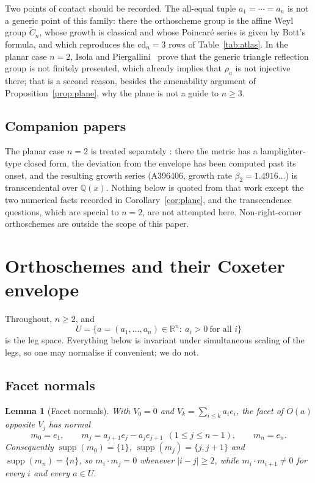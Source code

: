 \documentclass[11pt,a4paper]{article}
\newcommand{\R}{\mathbb{R}}
\newcommand{\Q}{\mathbb{Q}}
\newcommand{\cd}{\mathrm{cd}}
\newtheorem{lemma}[theorem]{Lemma}
\theoremstyle{definition}
\theoremstyle{remark}
\theoremstyle{plain}
\begin{document}
Two points of contact should be recorded. The all-equal tuple $a_1=\cdots=a_n$ is not a generic
point of this family: there the orthoscheme group is the affine Weyl group $\widetilde C_n$,
whose growth is classical and whose Poincar\'e series is given by Bott's formula, and which
reproduces the $\cd_n=3$ rows of Table~\ref{tab:atlas}. In the planar case $n=2$, Isola and
Piergallini~\cite{isola-piergallini} prove that the generic triangle reflection group is not
finitely presented, which already implies that $\rho_a$ is not injective there; that is a second
reason, besides the amenability argument of Proposition~\ref{prop:plane}, why the plane is not a
guide to $n\ge3$.

\subsection{Companion papers}

The planar case $n=2$ is treated separately \cite{Bonfioli1}: there the metric has a
lamplighter-type closed form, the deviation from the envelope has been computed past its onset,
and the resulting growth series (\textup{A396406}, growth rate $\beta_2=1.4916\ldots$) is
transcendental over $\Q(x)$. Nothing below is quoted from that work except the two numerical
facts recorded in Corollary~\ref{cor:plane}, and the transcendence questions, which are special
to $n=2$, are not attempted here. Non-right-corner orthoschemes are outside the scope of this
paper.

\section{Orthoschemes and their Coxeter envelope}\label{sec:setting}

Throughout, $n\ge2$, and
\[
U=\{a=(a_1,\dots,a_n)\in\R^n:\ a_i>0\ \text{for all }i\}
\]
is the leg space. Everything below is invariant under simultaneous scaling of the legs, so one
may normalise if convenient; we do not.

\subsection{Facet normals}

\begin{lemma}[Facet normals]\label{lem:normals}
With $V_0=0$ and $V_k=\sum_{i\le k}a_ie_i$, the facet of $O(a)$ opposite $V_j$ has normal
\[
m_0=e_1,\qquad m_j=a_{j+1}e_j-a_je_{j+1}\ \ (1\le j\le n-1),\qquad m_n=e_n .
\]
Consequently $\operatorname{supp}(m_0)=\{1\}$, $\operatorname{supp}(m_j)=\{j,j+1\}$ and
$\operatorname{supp}(m_n)=\{n\}$, so $m_i\cdot m_j=0$ whenever $|i-j|\ge2$, while
$m_i\cdot m_{i+1}\ne0$ for every $i$ and every $a\in U$.
\end{lemma}
\end{document}
